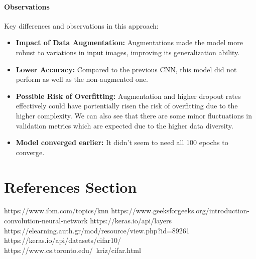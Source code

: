 \documentclass[lettersize,journal]{IEEEtran}
\begin{document}
\paragraph{\textbf{Observations}}

Key differences and observations in this approach:
\begin{itemize}
    \item \textbf{Impact of Data Augmentation:} Augmentations made the model more robust to variations in input images, improving its generalization ability.
    \item \textbf{Lower Accuracy:} Compared to the previous CNN, this model did not perform as well as the non-augmented one.
    \item \textbf{Possible Risk of Overfitting:} Augmentation and higher dropout rates effectively could have portentially risen the risk of overfitting due to the higher complexity. We can also see that there are some minor fluctuations in validation metrics which are expected due to the higher data diversity.
    \item \textbf{Model converged earlier:} It didn't seem to need all 100 epochs to converge.
\end{itemize}


\section{References Section}
\begin{thebibliography}{1}

https://www.ibm.com/topics/knn
https://www.geeksforgeeks.org/introduction-convolution-neural-network
https://keras.io/api/layers
https://elearning.auth.gr/mod/resource/view.php?id=89261
https://keras.io/api/datasets/cifar10/
https://www.cs.toronto.edu/~kriz/cifar.html
\end{thebibliography}
\end{document}
